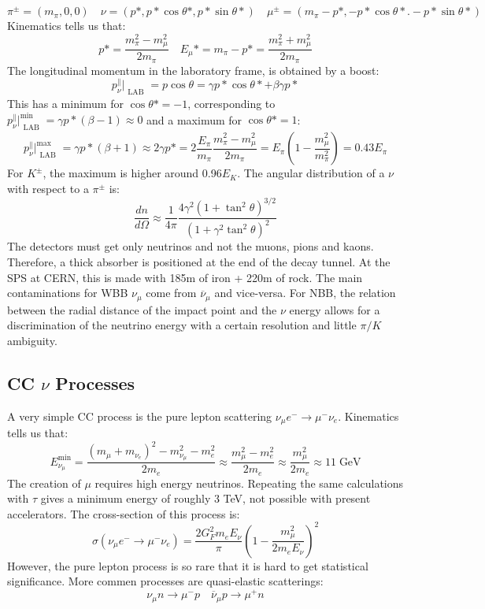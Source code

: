 \documentclass[10.75pt,a4paper,openright,bottom=2cm]{article}
\begin{document}
\[
\pi^\pm=(m_\pi,0,0) \quad \nu=(p*,p*\cos\theta*, p*\sin\theta*) \quad \mu^\pm=(m_\pi-p*,-p*\cos\theta*.-p*\sin\theta*)
\]
Kinematics tells us that:
\[
p*=\frac{m_\pi^2-m_\mu^2}{2m_\pi} \quad E_\mu*=m_\pi-p*=\frac{m_\pi^2+m_\mu^2}{2m_\pi}
\]
The longitudinal momentum in the laboratory frame, is obtained by a boost:
\[
p_\nu^\parallel\bigr|_{\substack{\text{LAB}}}=p\cos\theta=\gamma p*\cos\theta*+\beta\gamma p*
\]
This has a minimum for $\cos\theta*=-1$, corresponding to $p_\nu^\parallel\bigr|^{{\min}}_{\substack{\text{LAB}}}=\gamma p*(\beta-1)\approx0$ and a maximum for $\cos\theta*=1$:
\[
p_\nu^\parallel\bigr|^{{\max}}_{\substack{\text{LAB}}}=\gamma p*(\beta+1)\approx2\gamma p*=2\frac{E_\pi}{m_\pi}\frac{m_\pi^2-m_\mu^2}{2m_\pi}=E_\pi\left(1-\frac{m_\mu^2}{m_\pi^2}\right)=0.43E_\pi
\]
For $K^\pm$, the maximum is higher around 0.96$E_K$. The angular distribution of a $\nu$ with respect to a $\pi^\pm$ is:
\[
\frac{dn}{d\Omega}\approx\frac{1}{4\pi}\frac{4\gamma^2(1+\tan^2\theta)^{3/2}}{(1+\gamma^2\tan^2\theta)^2}
\]
The detectors must get only neutrinos and not the muons, pions and kaons. Therefore, a thick absorber is positioned at the end of the decay tunnel. At the SPS at CERN, this is made with 185m of iron + 220m of rock. The main contaminations for WBB $\nu_\mu$ come from $\overline{\nu}_\mu$ and vice-versa. For NBB, the relation between the radial distance of the impact point and the $\nu$ energy allows for a discrimination of the neutrino energy with a certain resolution and little $\pi/K$ ambiguity.
\subsection{CC $\nu$ Processes}
A very simple CC process is the pure lepton scattering $\nu_\mu e^-\to\mu^-\nu_e$. Kinematics tells us that:
\[
E_{\nu_\mu}^{\min}=\frac{(m_\mu+m_{\nu_e})^2-m_{\nu_\mu}^2-m_e^2}{2m_e}\approx\frac{m_\mu^2-m_e^2}{2m_e}\approx\frac{m_\mu^2}{2m_e}\approx11\;\text{GeV}
\]
The creation of $\mu$ requires high energy neutrinos. Repeating the same calculations with $\tau$ gives a minimum energy of roughly 3 TeV, not possible with present accelerators. The cross-section of this process is:
\[
\sigma(\nu_\mu e^-\to\mu^-\nu_e)=\frac{2G_F^2m_eE_\nu}{\pi}\left(1-\frac{m_\mu^2}{2m_eE_\nu}\right)^2
\]
However, the pure lepton process is so rare that it is hard to get statistical significance. More commen processes are quasi-elastic scatterings:
\[
\nu_\mu n\to\mu^-p \quad \overline{\nu}_\mu p\to\mu^+n
\]
\end{document}
